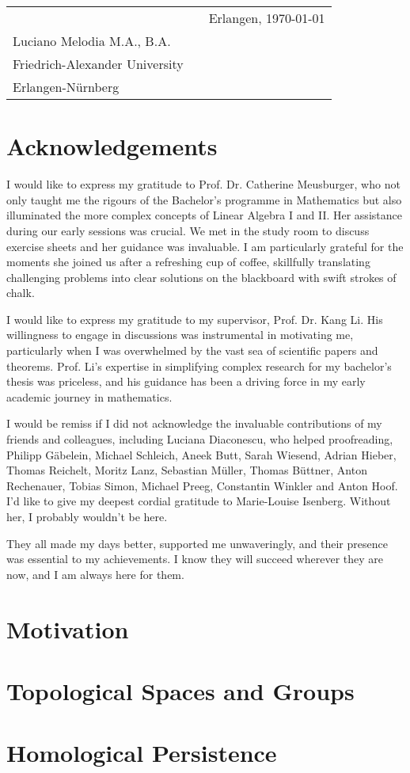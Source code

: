 \documentclass[b5paper, 11pt, twoside]{report}
\begin{document}
\vspace{2cm}
\begin{tabular}{@{}p{3.5in}p{2in}p{2in}@{}}
	\hrulefill                 &   & Erlangen, \today \\
	Luciano Melodia M.A., B.A. &   &                  \\
	Friedrich-Alexander University \\
	Erlangen-Nürnberg
\end{tabular}

\chapter*{Acknowledgements}
I would like to express my gratitude to Prof. Dr. Catherine Meusburger, who not only taught me the rigours of the Bachelor's programme in Mathematics but also illuminated the more complex concepts of Linear Algebra I and II. Her assistance during our early sessions was crucial. We met in the study room to discuss exercise sheets and her guidance was invaluable. I am particularly grateful for the moments she joined us after a refreshing cup of coffee, skillfully translating challenging problems into clear solutions on the blackboard with swift strokes of chalk.

I would like to express my gratitude to my supervisor, Prof. Dr. Kang Li. His willingness to engage in discussions was instrumental in motivating me, particularly when I was overwhelmed by the vast sea of scientific papers and theorems. Prof. Li's expertise in simplifying complex research for my bachelor's thesis was priceless, and his guidance has been a driving force in my early academic journey in mathematics.

I would be remiss if I did not acknowledge the invaluable contributions of my friends and colleagues, including Luciana Diaconescu, who helped proofreading, Philipp Gäbelein, Michael Schleich, Aneek Butt, Sarah Wiesend, Adrian Hieber, Thomas Reichelt, Moritz Lanz, Sebastian Müller, Thomas Büttner, Anton Rechenauer, Tobias Simon, Michael Preeg, Constantin Winkler and Anton Hoof. I'd like to give my deepest cordial gratitude to Marie-Louise Isenberg. Without her, I probably wouldn't be here.

They all made my days better, supported me unwaveringly, and their presence was essential to my achievements. I know they will succeed wherever they are now, and I am always here for them.

\newpage
\tableofcontents

\singlespacing
\chapter{Motivation}


\chapter{Topological Spaces and Groups}


\chapter{Homological Persistence}


\singlespacing
\printbibliography

\newpage
\printindex
\end{document}
